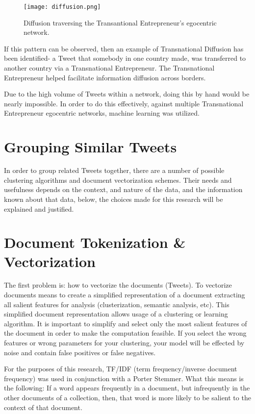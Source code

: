 \begin{figure}[H]
  \centering
  \texttt{[image: diffusion.png]}
  \caption{Diffusion traversing the Transantional Entrepreneur's egocentric network.}
\end{figure}

If this pattern can be observed, then an example of Transnational
Diffusion has been identified- a Tweet that somebody in one country
made, was transferred to another country via a Transnational
Entrepreneur. The Transnational Entrepreneur helped facilitate
information diffusion across borders.

Due to the high volume of Tweets within a network, doing this by hand
would be nearly impossible. In order to do this effectively, against
multiple Transnational Entrepreneur egocentric networks, machine
learning was utilized.

\section{Grouping Similar Tweets}
In order to group related Tweets together, there are a number of
possible clustering algorithms and document vectorization
schemes. Their needs and usefulness depends on the context, and nature
of the data, and the information known about that data, below, the
choices made for this research will be explained and justified.

\section{Document Tokenization \& Vectorization}
The first problem is: how to vectorize the documents (Tweets). To
vectorize documents means to create a simplified representation of a
document extracting all salient features for analysis (clusterization,
semantic analysis, etc). This simplified document representation
allows usage of a clustering or learning algorithm. It is important to
simplify and select only the most salient features of the document in
order to make the computation feasible. If you select the wrong
features or wrong parameters for your clustering, your model will be
effected by noise and contain false positives or false negatives.

For the purposes of this research, TF/IDF (term frequency/inverse
document frequency) was used in conjunction with a Porter
Stemmer. What this means is the following: If a word appears
frequently in a document, but infrequently in the other documents of a
collection, then, that word is more likely to be salient to the
context of that document.

